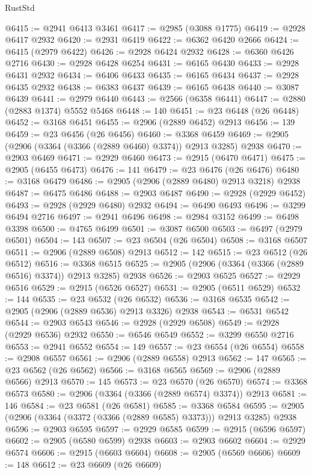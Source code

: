 \begin{lexlean}{RustStd}
\begin{coremodule}
@6415 := @2941 @6413 @3461
@6417 := @2985 (@3088 @1775)
@6419 := @2928 @6417 @2932
@6420 := @2931 @6419
@6422 := @6362 @6420 @2666
@6424 := @6415 (@2979 @6422)
@6426 := @2928 @6424 @2932
@6428 := @6360 @6426 @2716
@6430 := @2928 @6428 @6254
@6431 := @6165 @6430
@6433 := @2928 @6431 @2932
@6434 := @6406 @6433
@6435 := @6165 @6434
@6437 := @2928 @6435 @2932
@6438 := @6383 @6437
@6439 := @6165 @6438
@6440 := @3087 @6439
@6441 := @2979 @6440
@6443 := @2566 (@6358 @6441)
@6447 := @2880 (@2883 @1374) @5552 @5468
@6448 := 140
@6451 := @23 @6448 (@26 @6448)
@6452 := @3168 @6451
@6455 := @2906 (@2889 @6452) @2913
@6456 := 139
@6459 := @23 @6456 (@26 @6456)
@6460 := @3368 @6459
@6469 := @2905 (@2906 (@3364 (@3366 (@2889 @6460) @3374)) @2913 @3285) @2938
@6470 := @2903 @6469
@6471 := @2929 @6460
@6473 := @2915 (@6470 @6471)
@6475 := @2905 (@6455 @6473)
@6476 := 141
@6479 := @23 @6476 (@26 @6476)
@6480 := @3168 @6479
@6486 := @2905 (@2906 (@2889 @6480) @2913 @3218) @2938
@6487 := @6475 @6486
@6488 := @2903 @6487
@6490 := @2928 (@2929 @6452)
@6493 := @2928 (@2929 @6480) @2932
@6494 := @6490 @6493
@6496 := @3299 @6494 @2716
@6497 := @2941 @6496
@6498 := @2984 @3152
@6499 := @6498 @3398
@6500 := @4765 @6499
@6501 := @3087 @6500
@6503 := @6497 (@2979 @6501)
@6504 := 143
@6507 := @23 @6504 (@26 @6504)
@6508 := @3168 @6507
@6511 := @2906 (@2889 @6508) @2913
@6512 := 142
@6515 := @23 @6512 (@26 @6512)
@6516 := @3368 @6515
@6525 := @2905 (@2906 (@3364 (@3366 (@2889 @6516) @3374)) @2913 @3285) @2938
@6526 := @2903 @6525
@6527 := @2929 @6516
@6529 := @2915 (@6526 @6527)
@6531 := @2905 (@6511 @6529)
@6532 := 144
@6535 := @23 @6532 (@26 @6532)
@6536 := @3168 @6535
@6542 := @2905 (@2906 (@2889 @6536) @2913 @3326) @2938
@6543 := @6531 @6542
@6544 := @2903 @6543
@6546 := @2928 (@2929 @6508)
@6549 := @2928 (@2929 @6536) @2932
@6550 := @6546 @6549
@6552 := @3299 @6550 @2716
@6553 := @2941 @6552
@6554 := 149
@6557 := @23 @6554 (@26 @6554)
@6558 := @2908 @6557
@6561 := @2906 (@2889 @6558) @2913
@6562 := 147
@6565 := @23 @6562 (@26 @6562)
@6566 := @3168 @6565
@6569 := @2906 (@2889 @6566) @2913
@6570 := 145
@6573 := @23 @6570 (@26 @6570)
@6574 := @3368 @6573
@6580 := @2906 (@3364 (@3366 (@2889 @6574) @3374)) @2913
@6581 := 146
@6584 := @23 @6581 (@26 @6581)
@6585 := @3368 @6584
@6595 := @2905 (@2906 (@3364 (@3372 (@3366 (@2889 @6585) @3373))) @2913 @3285) @2938
@6596 := @2903 @6595
@6597 := @2929 @6585
@6599 := @2915 (@6596 @6597)
@6602 := @2905 (@6580 @6599) @2938
@6603 := @2903 @6602
@6604 := @2929 @6574
@6606 := @2915 (@6603 @6604)
@6608 := @2905 (@6569 @6606)
@6609 := 148
@6612 := @23 @6609 (@26 @6609)

\end{coremodule}
\end{lexlean}
